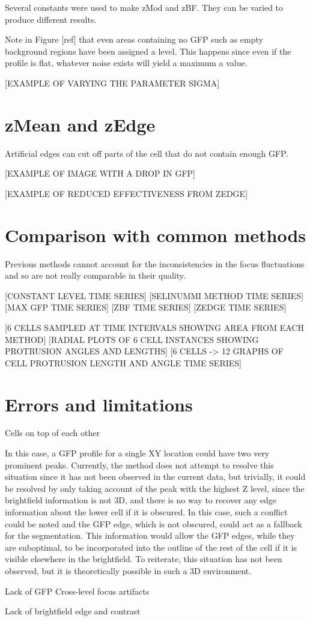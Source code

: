 Several constants were used to make zMod and zBF. They can be varied to produce different results.

Note in Figure [ref] that even areas containing no GFP such as empty background regions have been assigned a level. This happens since even if the profile is flat, whatever noise exists will yield a maximum a value.

[EXAMPLE OF VARYING THE PARAMETER SIGMA]

\section{zMean and zEdge}

Artificial edges can cut off parts of the cell that do not contain enough GFP.

[EXAMPLE OF IMAGE WITH A DROP IN GFP]

[EXAMPLE OF REDUCED EFFECTIVENESS FROM ZEDGE]

\section{Comparison with common methods}

Previous methods cannot account for the inconsistencies in the focus fluctuations and so are not really comparable in their quality.

[CONSTANT LEVEL TIME SERIES]
[SELINUMMI METHOD TIME SERIES]
[MAX GFP TIME SERIES]
[ZBF TIME SERIES]
[ZEDGE TIME SERIES]

[6 CELLS SAMPLED AT TIME INTERVALS SHOWING AREA FROM EACH METHOD]
[RADIAL PLOTS OF 6 CELL INSTANCES SHOWING PROTRUSION ANGLES AND LENGTHS]
[6 CELLS -> 12 GRAPHS OF CELL PROTRUSION LENGTH AND ANGLE TIME SERIES]

\section{Errors and limitations}

Cells on top of each other

In this case, a GFP profile for a single XY location could have two very prominent peaks. Currently, the method does not attempt to resolve this situation since it has not been observed in the current data, but trivially, it could be resolved by only taking account of the peak with the highest Z level, since the brightfield information is not 3D, and there is no way to recover any edge information about the lower cell if it is obscured. In this case, such a conflict could be noted and the GFP edge, which is not obscured, could act as a fallback for the segmentation. This information would allow the GFP edges, while they are suboptimal, to be incorporated into the outline of the rest of the cell if it is visible elsewhere in the brightfield. To reiterate, this situation has not been observed, but it is theoretically possible in such a 3D environment.

Lack of GFP
Cross-level focus artifacts

Lack of brightfield edge and contrast
